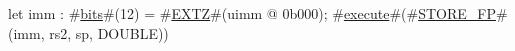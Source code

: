 let imm : #\hyperref[sailRISCVzbits]{bits}#(12) = #\hyperref[sailRISCVzEXTZ]{EXTZ}#(uimm @ 0b000);
#\hyperref[sailRISCVzexecute]{execute}#(#\hyperref[sailRISCVzSTOREzyFP]{STORE\_FP}#(imm, rs2, sp, DOUBLE))
